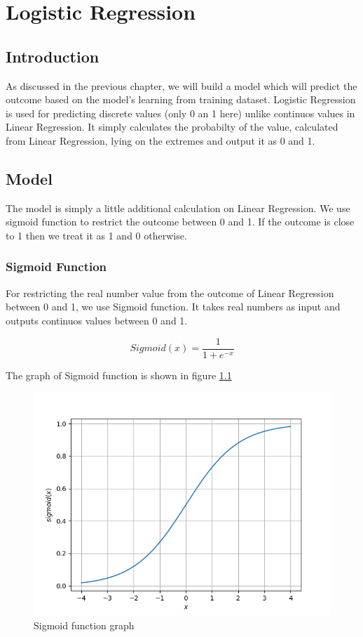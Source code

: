 
\chapter{Logistic Regression}
\label{chp:logistic}

\section{Introduction}
As discussed in the previous chapter, we will build a model which will predict
the outcome based on the model's learning from training dataset. Logistic Regression
is used for predicting discrete values (only 0 an 1 here) unlike continuos values in Linear Regression. It simply
calculates the probabilty of the value, calculated from Linear Regression, lying on the extremes and
output it as 0 and 1.

\section{Model} \label{sec:log_model}
The model is simply a little additional calculation on Linear Regression. We use sigmoid function
to restrict the outcome between 0 and 1. If the outcome is close to 1 then we treat it as 1 and 0 otherwise.

\subsection{Sigmoid Function}

For restricting the real number value from the outcome of Linear Regression
between 0 and 1, we use Sigmoid function. It takes real numbers as input and 
outputs continuos values between 0 and 1.

\begin{equation}
    Sigmoid(x) = \frac{1}{1+e^{-x}}
\end{equation}

The graph of Sigmoid function is shown in figure \ref{fig:sigmoid}

\begin{figure}
    \includegraphics[]{figs/sigmoid_plot.png}
    \caption{Sigmoid function graph}
    \label{fig:sigmoid}
\end{figure}

